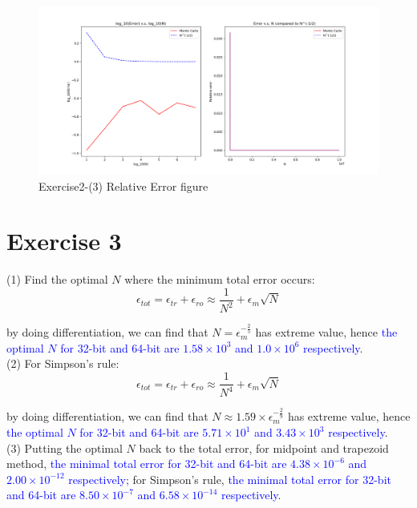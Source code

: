 \documentclass[aps,12pt,prd,nofootinbib,bibnotes, amsmath,amssymb,showpacs,superscriptaddress,floatfix]{revtex4-2}
\begin{document}
\begin{figure}
	\centering
	\includegraphics[width=1.0\textwidth]{figure_Exercise2-(3)}
	\caption{Exercise2-(3) Relative Error figure}
\end{figure}

  
\section{Exercise 3}
(1) Find the optimal $N$ where the minimum total error occurs:
\begin{equation}
\epsilon_{tot}=\epsilon_{tr}+\epsilon_{ro} \approx \frac{1}{N^2}+\epsilon_{m} \sqrt{N}
\end{equation}

by doing differentiation, we can find that $N = \epsilon_{m}^{-\frac{2}{5}}$ has extreme value, hence \textcolor{blue}{the optimal $N$ for 32-bit and 64-bit are $1.58 \times 10^{3}$ and $1.0 \times 10^{6}$ respectively}.\\

(2) For Simpson's rule:
\begin{equation}
\epsilon_{tot}=\epsilon_{tr}+\epsilon_{ro} \approx \frac{1}{N^4}+\epsilon_{m} \sqrt{N}
\end{equation}

by doing differentiation, we can find that $N \approx 1.59 \times \epsilon_{m}^{-\frac{2}{9}}$ has extreme value, hence \textcolor{blue}{the optimal $N$ for 32-bit and 64-bit are $5.71 \times 10^{1}$ and $3.43 \times 10^{3}$ respectively}.\\

(3) Putting the optimal $N$ back to the total error, for midpoint and trapezoid method, \textcolor{blue}{the minimal total error for 32-bit and 64-bit are $4.38 \times 10^{-6}$ and $2.00 \times 10^{-12}$ respectively}; for Simpson's rule, \textcolor{blue}{the minimal total error for 32-bit and 64-bit are $8.50 \times 10^{-7}$ and $6.58 \times 10^{-14}$ respectively}. 
    
\end{document}
